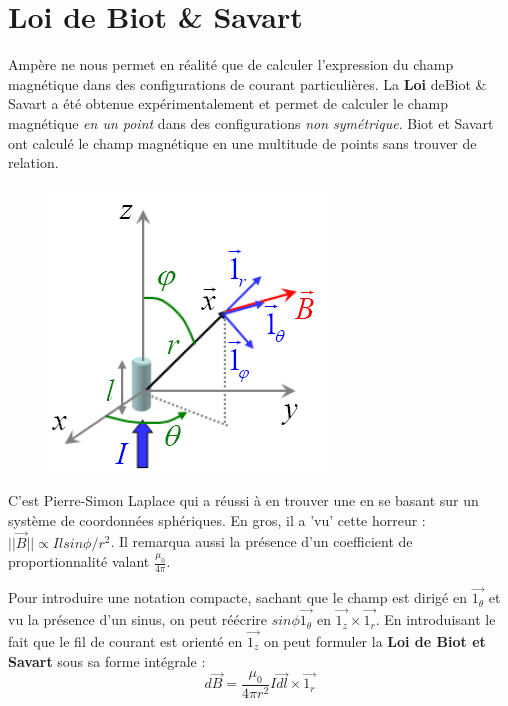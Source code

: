 \documentclass	[11pt, a4paper, openany]{book}
\begin{document}
\section{Loi de Biot \& Savart}
Ampère ne nous permet en réalité que de calculer l'expression du champ magnétique dans des configurations de courant particulières. La \textbf{Loi} deBiot \& Savart a été obtenue expérimentalement et permet de calculer le champ magnétique \textit{en un point} dans des configurations \textit{non symétrique}. Biot et Savart ont calculé le champ magnétique en une multitude de points sans trouver de relation. 

\begin{figure}
\includegraphics[scale=0.55]{magneto/image6.png}
\end{figure}

C'est Pierre-Simon Laplace qui a réussi à en trouver une en se basant sur un système de coordonnées sphériques. En gros, il a 'vu' cette  horreur : $ ||\vec{B}|| \propto Il sin\phi / r^2$. Il remarqua aussi la présence d'un coefficient de proportionnalité valant $\frac{\mu_0}{4\pi}$.



Pour introduire une notation compacte, sachant que le champ est dirigé en $\vec{1_\theta}$ et vu la présence d'un sinus, on peut réécrire $sin\phi \vec{1_\theta}$ en $\vec{1_z} \times \vec{1_r}$. En introduisant le fait que le fil de courant est orienté en $\vec{1_z}$ on peut formuler la \textbf{Loi de Biot et Savart} sous sa forme intégrale :
\begin{equation}
d\vec{B} = \frac{\mu_0}{4\pi r^2}I\vec{dl} \times \vec{1_r}
\end{equation}
\end{document}
